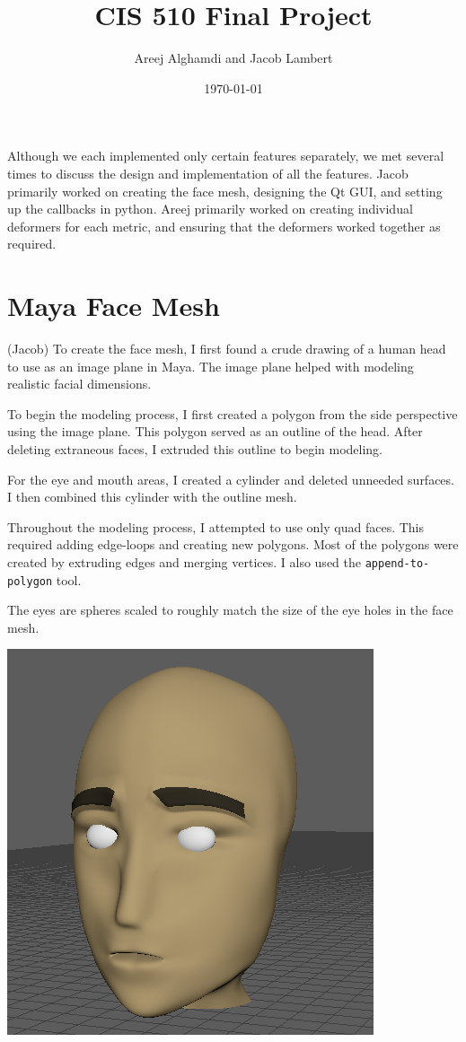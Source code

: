 \documentclass{article}
\title{CIS 510 Final Project}
\author{Areej Alghamdi and Jacob Lambert}
\date{\today}
\begin{document}
\maketitle

Although we each implemented only certain features separately, we met several times to discuss the design and implementation of all the features. Jacob primarily worked on creating the face mesh, designing the Qt GUI, and setting up the callbacks in python. Areej primarily worked on creating individual deformers for each metric, and ensuring that the deformers worked together as required.

\section*{Maya Face Mesh} (Jacob)
To create the face mesh, I first found a crude drawing of a human head to use as an image plane in Maya. The image plane helped with modeling realistic facial dimensions. 

To begin the modeling process, I first created a polygon from the side perspective using the image plane. This polygon served as an outline of the head. After deleting extraneous faces,
I extruded this outline to begin modeling. 

For the eye and mouth areas, I created a cylinder and deleted unneeded surfaces. I then combined this cylinder with the outline mesh.

Throughout the modeling process, I attempted to use only quad faces. This required adding edge-loops and creating new polygons. Most of the polygons were created by extruding edges and merging vertices. I also used the \texttt{append-to-polygon} tool.

The eyes are spheres scaled to roughly match the size of the eye holes in the face mesh.\newline

\includegraphics[scale=.4]
  {face.png}
\end{document}
